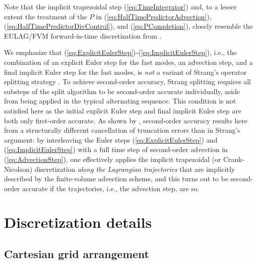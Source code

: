 \documentclass{ametsoc}
\newcommand{\sblue}[1]{\textcolor{sblue}{#1}}
\newcommand{\revision}[1]{\sblue{#1}}
\theoremstyle{definition}
\newcommand{\eq}[1]{(\ref{#1})}
\begin{document}
Note that the implicit trapezoidal step \eq{eq:TimeIntegrator} and, to a 
lesser extent the treatment of the $P$ in \eq{eq:HalfTimePredictorAdvection}, 
\eq{eq:HalfTimePredictorDivControl}, and \eq{eq:PCompletion}, closely resemble the EULAG/FVM forward-in-time discretization from 
\citet{SmolarkiewiczMargolin1997,PrusaEtAl2008,SmolarkiewiczEtAl2014,SmolarkiewiczEtAl2016, KuehnleinEtAl2019}. 

\revision{We emphasize that 
\eq{eq:ExplicitEulerStep}-\eq{eq:ImplicitEulerStep}, i.e., the 
combination of an explicit Euler step for the fast modes, an advection
step, and a final implicit Euler step for the fast modes, is \emph{not} a
variant of Strang's operator splitting strategy \citep{Strang1968}}. To
achieve second-order accuracy, Strang splitting requires all substeps of 
the split algorithm to be second-order accurate individually, aside from
being applied in the typical alternating sequence. This condition is not 
satisfied here as the initial explicit Euler step and final implicit Euler step are 
both only first-order accurate. As shown by \citet{SmolarkiewiczMargolin1993}, second-order accuracy results here from a structurally different 
cancellation of truncation errors \revision{than in Strang's argument:} 
\revision{by interleaving the Euler steps \eq{eq:ExplicitEulerStep} 
and \eq{eq:ImplicitEulerStep} with a full time step of second-order 
advection in \eq{eq:AdvectionStep}, one effectively applies the
implicit trapezoidal (or Crank-Nicolson) discretization 
\emph{along the Lagrangian trajectories} that are implicitly 
described by the finite-volume advection scheme, and this turns 
out to be second-order accurate if the trajectories, i.e., the advection 
step, are so}. 




\section{Discretization details}
\label{sec:DiscretizationDetails}


\subsection{Cartesian grid arrangement}
\label{ssec:GridArrangement}
\end{document}
